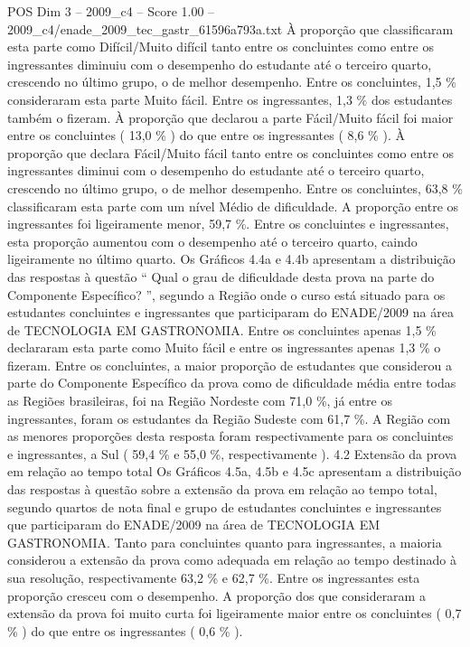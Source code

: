\begin{textsample}{POS Dim 3 – 2009\_c4 – Score 1.00 – 2009\_c4/enade\_2009\_tec\_gastr\_61596a793a.txt}
À proporção que classificaram esta parte como Difícil/Muito difícil tanto entre os concluintes como entre os ingressantes diminuiu com o desempenho do estudante até o terceiro quarto, crescendo no último grupo, o de melhor desempenho.
Entre os concluintes, 1,5 \% consideraram esta parte Muito fácil.
Entre os ingressantes, 1,3 \% dos estudantes também o fizeram.
À proporção que declarou a parte Fácil/Muito fácil foi maior entre os concluintes ( 13,0 \% ) do que entre os ingressantes ( 8,6 \% ).
À proporção que declara Fácil/Muito fácil tanto entre os concluintes como entre os ingressantes diminui com o desempenho do estudante até o terceiro quarto, crescendo no último grupo, o de melhor desempenho.
Entre os concluintes, 63,8 \% classificaram esta parte com um nível Médio de dificuldade.
A proporção entre os ingressantes foi ligeiramente menor, 59,7 \%.
Entre os concluintes e ingressantes, esta proporção aumentou com o desempenho até o terceiro quarto, caindo ligeiramente no último quarto.
Os Gráficos 4.4a e 4.4b apresentam a distribuição das respostas à questão “ Qual o grau de dificuldade desta prova na parte do Componente Específico? ”, segundo a Região onde o curso está situado para os estudantes concluintes e ingressantes que participaram do ENADE/2009 na área de TECNOLOGIA EM GASTRONOMIA.
Entre os concluintes apenas 1,5 \% declararam esta parte como Muito fácil e entre os ingressantes apenas 1,3 \% o fizeram.
Entre os concluintes, a maior proporção de estudantes que considerou a parte do Componente Específico da prova como de dificuldade média entre todas as Regiões brasileiras, foi na Região Nordeste com 71,0 \%, já entre os ingressantes, foram os estudantes da Região Sudeste com 61,7 \%.
A Região com as menores proporções desta resposta foram respectivamente para os concluintes e ingressantes, a Sul ( 59,4 \% e 55,0 \%, respectivamente ). 4.2 Extensão da prova em relação ao tempo total Os Gráficos 4.5a, 4.5b e 4.5c apresentam a distribuição das respostas à questão sobre a extensão da prova em relação ao tempo total, segundo quartos de nota final e grupo de estudantes concluintes e ingressantes que participaram do ENADE/2009 na área de TECNOLOGIA EM GASTRONOMIA.
Tanto para concluintes quanto para ingressantes, a maioria considerou a extensão da prova como adequada em relação ao tempo destinado à sua resolução, respectivamente 63,2 \% e 62,7 \%.
Entre os ingressantes esta proporção cresceu com o desempenho.
A proporção dos que consideraram a extensão da prova foi muito curta foi ligeiramente maior entre os concluintes ( 0,7 \% ) do que entre os ingressantes ( 0,6 \% ).

\end{textsample}

